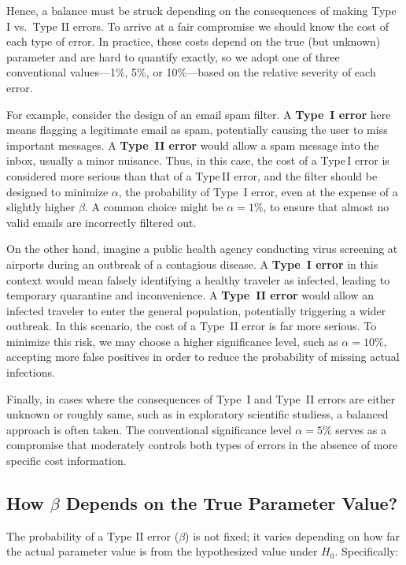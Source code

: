 \documentclass[twoside]{book}
\begin{document}
Hence, a balance must be struck depending on the consequences of making Type I vs.\ Type II errors. To arrive at a fair compromise we should know the cost of each type of error. In practice, these costs depend on the true (but unknown) parameter and are hard to quantify exactly, so we adopt one of three conventional values—1\%, 5\%, or 10\%—based on the relative severity of each error.

For example, consider the design of an email spam filter. A \textbf{Type~I error} here means flagging a legitimate email as spam, potentially causing the user to miss important messages. A \textbf{Type~II error} would allow a spam message into the inbox, usually a minor nuisance. Thus, in this case, the cost of a Type I error is considered more serious than that of a Type II error, and the filter should be designed to minimize $\alpha$, the probability of Type~I error, even at the expense of a slightly higher $\beta$. A common choice might be $\alpha = 1\%$, to ensure that almost no valid emails are incorrectly filtered out.

On the other hand, imagine a public health agency conducting virus screening at airports during an outbreak of a contagious disease. A \textbf{Type~I error} in this context would mean falsely identifying a healthy traveler as infected, leading to temporary quarantine and inconvenience. A \textbf{Type~II error} would allow an infected traveler to enter the general population, potentially triggering a wider outbreak. In this scenario, the cost of a Type~II error is far more serious. To minimize this risk, we may choose a higher significance level, such as $\alpha = 10\%$, accepting more false positives in order to reduce the probability of missing actual infections.

Finally, in cases where the consequences of Type~I and Type~II errors are either unknown or roughly same, such as in exploratory scientific studiess, a balanced approach is often taken. The conventional significance level $\alpha = 5\%$ serves as a compromise that moderately controls both types of errors in the absence of more specific cost information.

\subsection{How $\beta$ Depends on the True Parameter Value?}
The probability of a Type II error ($\beta$) is not fixed; it varies depending on how far the actual parameter value is from the hypothesized value under $H_0$. Specifically:
\end{document}
